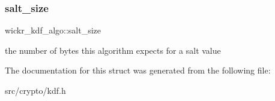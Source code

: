 \subsubsection{\texorpdfstring{salt\+\_\+size}{salt\_size}}
{\footnotesize\ttfamily wickr\+\_\+kdf\+\_\+algo\+::salt\+\_\+size}

the number of bytes this algorithm expects for a salt value 

The documentation for this struct was generated from the following file\+:\begin{DoxyCompactItemize}
\item 
src/crypto/kdf.\+h\end{DoxyCompactItemize}

